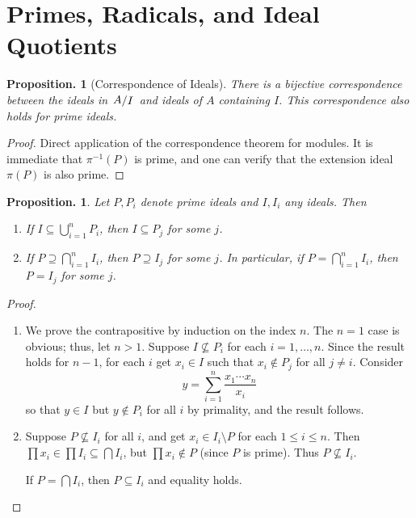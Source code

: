 \documentclass[11pt, a4paper]{memoir}
\theoremstyle{change}
\newtheorem{proposition}[theorem]{Proposition.}
\theoremstyle{plain}
\theoremstyle{nonumberplain}
\newtheorem{proof}{Proof}
\newcommand{\quot}[2]{\mathchoice{\left.\raisebox{0.10em}{$#1$}\middle/\raisebox{-0.10em}{$#2$}\right.}
                                 {\left.\raisebox{0.04em}{$#1$}\middle/\raisebox{-0.04em}{$#2$}\right.}
                                 {\left.\raisebox{0.01em}{$#1$}\middle/\raisebox{-0.01em}{$#2$}\right.}
                                 {\left.\raisebox{0em}{$#1$}\middle/\raisebox{0em}{$#2$}\right.}}
\numberwithin{equation}{section}
\begin{document}
\section{Primes, Radicals, and Ideal Quotients}
\begin{proposition}[Correspondence of Ideals]
    There is a bijective correspondence between the ideals in $\quot{A}{I}$ and ideals of $A$ containing $I$.
    This correspondence also holds for prime ideals.
\end{proposition}
\begin{proof}
    Direct application of the correspondence theorem for modules.
    It is immediate that $\pi^{-1}(P)$ is prime, and one can verify that the extension ideal $\pi(P)$ is also prime.
\end{proof}
\begin{proposition}\label{prop:p-int}
    Let $P,P_i$ denote prime ideals and $I,I_i$ any ideals.
    Then
    \begin{enumerate}[nl,r]
        \item If $I\subseteq\bigcup_{i=1}^n P_i$, then $I\subseteq P_j$ for some $j$.
        \item If $P\supseteq \bigcap_{i=1}^n I_i$, then $P\supseteq I_j$ for some $j$.
            In particular, if $P= \bigcap_{i=1}^n I_i$, then $P= I_j$ for some $j$.
    \end{enumerate}
\end{proposition}
\begin{proof}
    \begin{enumerate}[nl,r]
        \item We prove the contrapositive by induction on the index $n$.
            The $n=1$ case is obvious; thus, let $n>1$.
            Suppose $I\not\subseteq P_i$ for each $i=1,\ldots,n$.
            Since the result holds for $n-1$, for each $i$ get $x_i\in I$ such that $x_i\notin P_j$ for all $j\neq i$.
            Consider
            \begin{equation*}
                y=\sum_{i=1}^n\frac{x_1\cdots x_n}{x_i}
            \end{equation*}
            so that $y\in I$ but $y\notin P_i$ for all $i$ by primality, and the result follows.
        \item Suppose $P\not\subseteq I_i$ for all $i$, and get $x_i\in I_i\setminus P$ for each $1\leq i\leq n$.
            Then $\prod x_i\in\prod I_i\subseteq\bigcap I_i$, but $\prod x_i\notin P$ (since $P$ is prime).
            Thus $P\not\subseteq I_i$.

            If $P=\bigcap I_i$, then $P\subseteq I_i$ and equality holds.
    \end{enumerate}
\end{proof}
\end{document}
